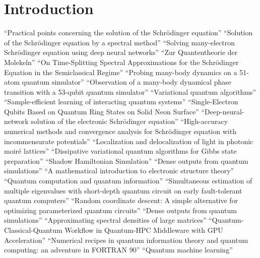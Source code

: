 \documentclass[]{article}
\begin{document}
\section{Introduction}
\cite{BLATT1967382}
``Practical points concerning the solution of the Schrödinger equation''
\cite{FEIT1982412}
``Solution of the Schrödinger equation by a spectral method''
\cite{HAN2019108929}
``Solving many-electron Schrödinger equation using deep neural networks''
\cite{https://doi.org/10.1002/andp.19273892002}
``Zur Quantentheorie der Molekeln''
\cite{BAO2002487}
``On Time-Splitting Spectral Approximations for the Schrödinger Equation in the Semiclassical Regime''
\cite{bernien2017probing}
``Probing many-body dynamics on a 51-atom quantum simulator''
\cite{zhang2017observation}
``Observation of a many-body dynamical phase transition with a 53-qubit quantum simulator''
\cite{cerezo2021variational}
``Variational quantum algorithms''
\cite{anshu2021sample}
``Sample-efficient learning of interacting quantum systems''
\cite{PhysRevLett.132.250603}
``Single-Electron Qubits Based on Quantum Ring States on Solid Neon Surface''
\cite{hermann2020deep}
``Deep-neural-network solution of the electronic Schr{\"o}dinger equation''
\cite{jiang2024high}
``High-accuracy numerical methods and convergence analysis for Schr{\"o}dinger equation with incommensurate potentials''
\cite{wang2020localization}
``Localization and delocalization of light in photonic moir{\'e} lattices''
\cite{ilin2024dissipativevariationalquantumalgorithms}
``Dissipative variational quantum algorithms for Gibbs state preparation''
\cite{somma2024shadowhamiltoniansimulation}
``Shadow Hamiltonian Simulation''
\cite{LIU2024113213}
``Dense outputs from quantum simulations''
\cite{lin2019mathematical}
``A mathematical introduction to electronic structure theory''
\cite{nielsen2010quantum}
``Quantum computation and quantum information''
\cite{ding2023simultaneous}
``Simultaneous estimation of multiple eigenvalues with short-depth quantum circuit on early fault-tolerant quantum computers''
\cite{ding2024random}
  ``Random coordinate descent: A simple alternative for optimizing parameterized quantum circuits''
\cite{LIU2024113213}
``Dense outputs from quantum simulations''
\cite{lin2016approximating}
``Approximating spectral densities of large matrices''
\cite{10628380}
``Quantum-Classical-Quantum Workflow in Quantum-HPC Middleware with GPU Acceleration''
\cite{ramkarthik2021numerical}
``Numerical recipes in quantum information theory and quantum computing: an adventure in FORTRAN 90''
\cite{biamonte2017quantum}
``Quantum machine learning''
\end{document}
